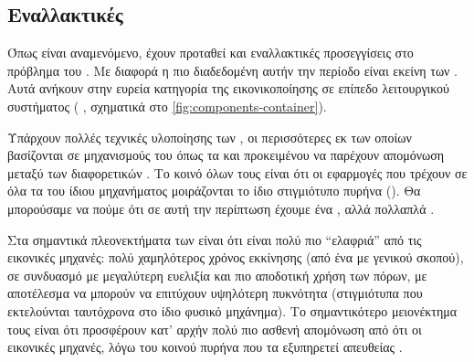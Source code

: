 
\subsection{Εναλλακτικές}
Όπως είναι αναμενόμενο, έχουν προταθεί και εναλλακτικές προσεγγίσεις στο
πρόβλημα του . Με διαφορά η πιο
διαδεδομένη αυτήν την περίοδο είναι εκείνη των . Αυτά ανήκουν
στην ευρεία κατηγορία της εικονικοποίησης σε επίπεδο λειτουργικού συστήματος
( \cite{wiki:os-level-virtualization}, σχηματικά στο
\ref{fig:components-container}).

Υπάρχουν πολλές τεχνικές υλοποίησης των , οι περισσότερες εκ των
οποίων βασίζονται σε μηχανισμούς του \linux{}  όπως τα 
και  προκειμένου να παρέχουν απομόνωση μεταξύ των διαφορετικών
. Το κοινό όλων τους είναι ότι οι εφαρμογές που τρέχουν σε όλα
τα  του ίδιου μηχανήματος μοιράζονται το ίδιο στιγμιότυπο πυρήνα
(). Θα μπορούσαμε να πούμε ότι σε αυτή την περίπτωση έχουμε ένα
, αλλά πολλαπλά .

Στα σημαντικά πλεονεκτήματα των  είναι ότι είναι πολύ πιο
``ελαφριά'' από τις εικονικές μηχανές: πολύ χαμηλότερος χρόνος εκκίνησης (από
ένα  με \guest{} γενικού σκοπού), σε συνδυασμό με μεγαλύτερη
ευελιξία και πιο αποδοτική χρήση των πόρων, με αποτέλεσμα να μπορούν να
επιτύχουν υψηλότερη πυκνότητα (στιγμιότυπα που εκτελούνται ταυτόχρονα στο ίδιο
φυσικό μηχάνημα). Το σημαντικότερο μειονέκτημα τους είναι ότι προσφέρουν κατ'
αρχήν πολύ πιο ασθενή απομόνωση από ότι οι εικονικές μηχανές, λόγω του κοινού
πυρήνα που τα εξυπηρετεί απευθείας \cite{lightvm}.



